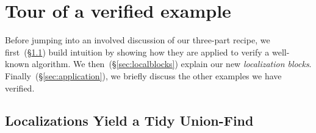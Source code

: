 \documentclass[acmsmall,screen]{acmart}
\newcommand{\tx}[1]{\text{#1}}
\begin{document}
\section{Tour of a verified example}
\label{sec:orientation}
Before jumping into an involved discussion of our three-part recipe, 
we first~(\S\ref{sec:unionfind}) build intuition by showing how 
they are applied to verify a well-known algorithm. 
We then~(\S\ref{sec:localblocks}) explain our new \emph{localization blocks}. 
Finally~(\S\ref{sec:application}), we briefly discuss the other 
examples we have verified. 



\subsection{Localizations Yield a Tidy Union-Find}
\label{sec:unionfind}

\renewcommand{\tx}[1]{\scriptsize {\text{#1}}}
\end{document}
